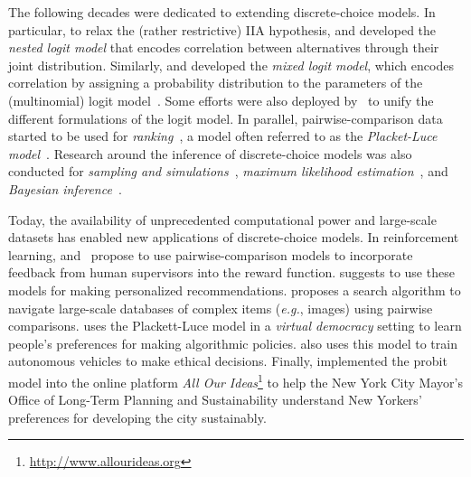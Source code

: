 The following decades were dedicated to extending discrete-choice models.
In particular, to relax the (rather restrictive) IIA hypothesis, \citet{ben1973structure} and \citet{williams1977formation} developed the \emph{nested logit model} that encodes correlation between alternatives through their joint distribution.
Similarly, \citet{boyd1980effect} and \citet{cardell1980measuring} developed the \emph{mixed logit model}, which encodes correlation by assigning a probability distribution to the parameters of the (multinomial) logit model~\citep{hensher2003mixed}.
Some efforts were also deployed by~\citet{yellot1977relationship} to unify the different formulations of the logit model.
In parallel, pairwise-comparison data started to be used for \emph{ranking}~\citep{ford1957solution,buehlmann1963pairwise,plackett1975analysis,wauthier2013efficient,negahban2017rank}, a model often referred to as the \emph{Placket-Luce model}~\citep{hensher2003mixed}.
Research around the inference of discrete-choice models was also conducted for \emph{sampling and simulations}~\citep{manski1981alternative,cosslett1981efficient}, \emph{maximum likelihood estimation}~\citep{hastie1998classification,hunter2004mm,maystre2015fast,vojnovic2016parameter}, and \emph{Bayesian inference}~\citep{guiver2009bayesian,caron2012efficient,houlsby2012collaborative}.

Today, the availability of unprecedented computational power and large-scale datasets has enabled new applications of discrete-choice models.
In reinforcement learning, \citet{sadigh2017active} and~\citet{christiano2017deep} propose to use pairwise-comparison models to incorporate feedback from human supervisors into the reward function.
\citet{ammar2015ranked} suggests to use these models for making personalized recommendations.
\citet{chumbalov2020scalable} proposes a search algorithm to navigate large-scale databases of complex items (\textit{e.g.}, images) using pairwise comparisons.
\citet{lee2019webuildai} uses the Plackett-Luce model in a \emph{virtual democracy} setting to learn people's preferences for making algorithmic policies.
\citet{noothigattu2018voting} also uses this model to train autonomous vehicles to make ethical decisions.
Finally, \citet{salganik2015wiki} implemented the probit model into the online platform \emph{All Our Ideas}\footnote{\href{http://www.allourideas.org/planyc_example?guides=true}{http://www.allourideas.org}} to help the New York City Mayor’s Office of Long-Term Planning and Sustainability understand New Yorkers' preferences for developing the city sustainably.

